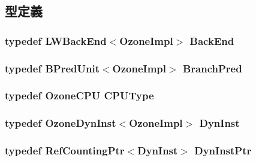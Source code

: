 \subsection{型定義}
\hypertarget{structOzoneImpl_a6e0be62c8e7de750cc20bb6cacf249b6}{
\subsubsection[{BackEnd}]{\setlength{\rightskip}{0pt plus 5cm}typedef {\bf LWBackEnd}$<${\bf OzoneImpl}$>$ {\bf BackEnd}}}
\label{structOzoneImpl_a6e0be62c8e7de750cc20bb6cacf249b6}
\hypertarget{structOzoneImpl_a490ef9e9d028e5a1ec5cabdec16b71c4}{
\subsubsection[{BranchPred}]{\setlength{\rightskip}{0pt plus 5cm}typedef {\bf BPredUnit}$<${\bf OzoneImpl}$>$ {\bf BranchPred}}}
\label{structOzoneImpl_a490ef9e9d028e5a1ec5cabdec16b71c4}
\hypertarget{structOzoneImpl_a29cb0c13130cdc0b3376343d5c795b88}{
\subsubsection[{CPUType}]{\setlength{\rightskip}{0pt plus 5cm}typedef {\bf OzoneCPU} {\bf CPUType}}}
\label{structOzoneImpl_a29cb0c13130cdc0b3376343d5c795b88}
\hypertarget{structOzoneImpl_a9f1e17b50571d733df7274a8337f023e}{
\subsubsection[{DynInst}]{\setlength{\rightskip}{0pt plus 5cm}typedef {\bf OzoneDynInst}$<${\bf OzoneImpl}$>$ {\bf DynInst}}}
\label{structOzoneImpl_a9f1e17b50571d733df7274a8337f023e}
\hypertarget{structOzoneImpl_a97c1adaf6da40f1dd1f86fe0b3b51249}{
\subsubsection[{DynInstPtr}]{\setlength{\rightskip}{0pt plus 5cm}typedef {\bf RefCountingPtr}$<${\bf DynInst}$>$ {\bf DynInstPtr}}}
